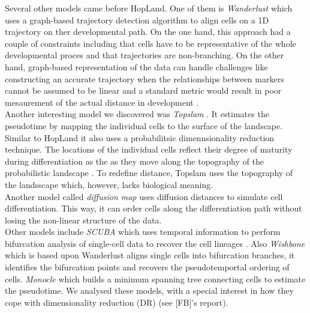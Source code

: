 Several other models came before HopLand.
One of them is \textit{Wanderlust} \cite{wanderlust} which uses a graph-based trajectory detection algorithm to align cells on a 1D trajectory on ther developmental path. On the one hand, this approach had a couple of constraints including that cells have to be representative of the whole developmental proces and that trajectories are non-branching. On the other hand, graph-based representation of the data can handle challenges like constructing an accurate trajectory when the relationships between markers cannot be assumed to be linear and a standard metric would result in poor mesaurement of the actual distance in development \cite{wanderlust}.\\
Another interesting model we discovered was \textit{Topslam} \cite{topslam}. It estimates the pseudotime by mapping the individual cells to the surface of the landscape. Similar to HopLand it also uses a probabilitsic dimennsionality reduction technique. The locations of the individual cells reflect their degree of maturity during differentiation as the as they move along the topography of the probabilistic landscape \cite{hopland}. 
To redefine distance, Topslam uses the topography of the landsscape which, however, lacks biological meaning.\\
Another model called \textit{diffusion map} \cite{diffusionmap} uses diffusion distances to simulate cell differentiation. This way, it can order cells along the differentiation path without losing the non-linear structure of the data.\\ 

Other models include \textit{SCUBA} \cite{scuba} which uses temporal information to perform bifurcation analysis of single-cell data to recover the cell lineages \cite{scuba}. Also \textit{Wishbone} \cite{wishbone} which is based upon Wanderlust aligns single cells into bifurcation branches, it identifies the bifurcation points and recovers the pseudotemportal ordering of cells. \textit{Monocle} \cite{monocle} which builds a minimum spanning tree connecting cells to estimate the pseudotime.
We analysed these models, with a special interest in how they cope with dimensionality reduction (DR) (see [FB]'s report).\\



